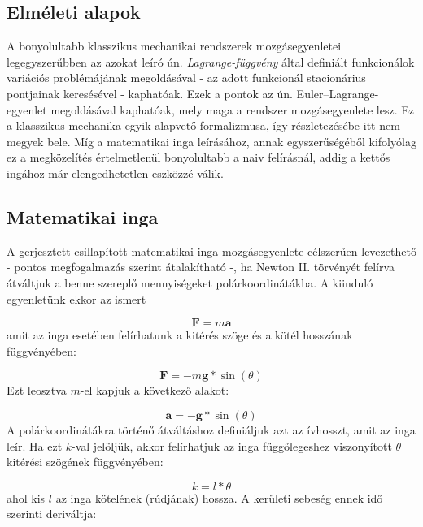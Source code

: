 \begin{multicols}{2}
\section{Elméleti alapok} \label{sec:2}
A bonyolultabb klasszikus mechanikai rendszerek mozgásegyenletei legegyszerűbben az azokat leíró ún. \emph{Lagrange-függvény} által definiált funkcionálok variációs problémájának megoldásával - az adott funkcionál stacionárius pontjainak keresésével - kaphatóak. Ezek a pontok az ún. Euler--Lagrange-egyenlet megoldásával kaphatóak, mely maga a rendszer mozgásegyenlete lesz\cite{gyorgyigeza}. Ez a klasszikus mechanika egyik alapvető formalizmusa, így részletezésébe itt nem megyek bele. Míg a matematikai inga leírásához, annak egyszerűségéből kifolyólag ez a megközelítés értelmetlenül bonyolultabb a naiv felírásnál, addig a kettős ingához már elengedhetetlen eszközzé válik.

\subsection{Matematikai inga} \label{sub:2.1}
A gerjesztett-csillapított matematikai inga mozgásegyenlete célszerűen levezethető - pontos megfogalmazás szerint átalakítható -, ha Newton II. törvényét felírva átváltjuk a benne szereplő mennyiségeket polárkoordinátákba. A kiinduló egyenletünk ekkor az ismert

\begin{equation}
    \boldsymbol{F} = m \boldsymbol{a}
\end{equation}
amit az inga esetében felírhatunk a kitérés szöge és a kötél hosszának függvényében:

\begin{equation}
    \boldsymbol{F} = -m \boldsymbol{g} * \sin{\left( \theta \right)}
\end{equation}
Ezt leosztva $m$-el kapjuk a következő alakot:

\begin{equation}
    \boldsymbol{a} = -\boldsymbol{g} * \sin{\left( \theta \right)}
\end{equation}
A polárkoordinátákra történő átváltáshoz definiáljuk azt az ívhosszt, amit az inga leír. Ha ezt $k$-val jelöljük, akkor felírhatjuk az inga függőlegeshez viszonyított $\theta$ kitérési szögének függvényében:

\begin{equation}
    k = l * \theta
\end{equation}
ahol kis $l$ az inga kötelének (rúdjának) hossza. A kerületi sebeség ennek idő szerinti deriváltja:


\end{multicols}
